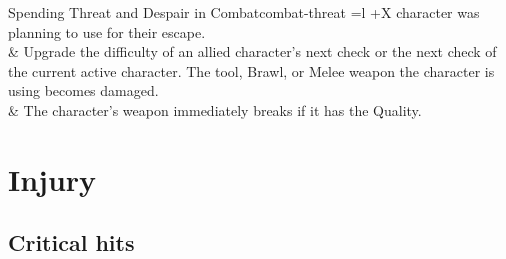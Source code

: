 \begin{multicols}{2}
\begin{table}[!htb]
\begin{GenesysTable}{Spending Threat and Despair in Combat}{combat-threat}{ =l +X}
                                              character was planning to use for their escape.\\
\despair  & Upgrade the difficulty of an allied character's next check or the next check of the current active character.\newline
            The tool, Brawl, or Melee weapon the character is using becomes damaged.\\
\despair\despair  & The character's weapon immediately breaks if it has the  Quality.\\
\end{GenesysTable}
\end{table}

\end{multicols}

\FloatBarrier

\section{Injury}
\subsection{Critical hits}

